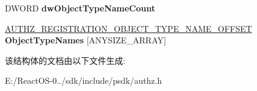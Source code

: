\begin{DoxyCompactItemize}
D\+W\+O\+RD {\bfseries dw\+Object\+Type\+Name\+Count}
\item 
\mbox{\label{struct___a_u_t_h_z___s_o_u_r_c_e___s_c_h_e_m_a___r_e_g_i_s_t_r_a_t_i_o_n_a5f3f52395b9d1588e07ce136c7f593cb}} 
\hyperlink{struct___a_u_t_h_z___r_e_g_i_s_t_r_a_t_i_o_n___o_b_j_e_c_t___t_y_p_e___n_a_m_e___o_f_f_s_e_t}{A\+U\+T\+H\+Z\+\_\+\+R\+E\+G\+I\+S\+T\+R\+A\+T\+I\+O\+N\+\_\+\+O\+B\+J\+E\+C\+T\+\_\+\+T\+Y\+P\+E\+\_\+\+N\+A\+M\+E\+\_\+\+O\+F\+F\+S\+ET} {\bfseries Object\+Type\+Names} \mbox{[}A\+N\+Y\+S\+I\+Z\+E\+\_\+\+A\+R\+R\+AY\mbox{]}
\end{DoxyCompactItemize}


该结构体的文档由以下文件生成\+:\begin{DoxyCompactItemize}
\item 
E\+:/\+React\+O\+S-\/0../sdk/include/psdk/authz.\+h\end{DoxyCompactItemize}
